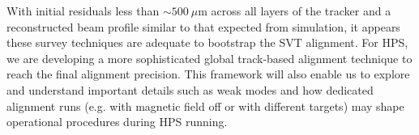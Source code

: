With initial residuals less than $\sim 500~\mu$m across all layers of 
the tracker and a reconstructed beam profile similar to that expected from simulation, it appears these survey techniques 
are adequate to bootstrap the SVT alignment. 
For HPS, we are developing a more sophisticated global track-based alignment technique to reach 
the final alignment precision. This framework will also enable us to explore and understand important details 
such as weak modes and how dedicated alignment runs 
(e.g. with magnetic field off or with different targets) may shape operational procedures during HPS running.
